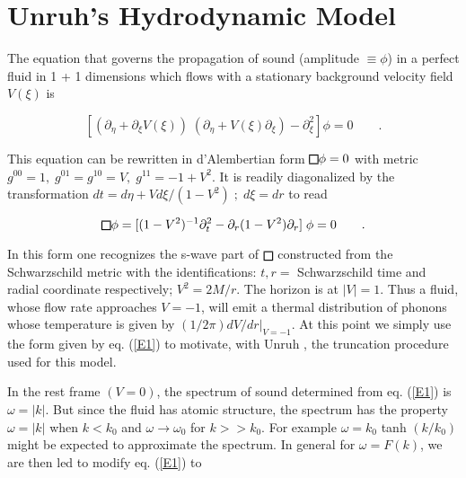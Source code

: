 \documentclass[12pt]{article}
\def\sqr#1#2{{\vcenter{\vbox{\hrule height.#2pt
          \hbox{\vrule width.#2pt height#1pt \kern#1pt
           \vrule width.#2pt}
           \hrule height.#2pt}}}}
\def\square{\mathchoice\sqr68\sqr68\sqr{4.2}6\sqr{3}6}
\begin{document}
\section{Unruh's Hydrodynamic Model}\label{SS2}



The equation that governs the propagation of sound (amplitude $ \equiv \phi $) 
in a perfect fluid in 1 + 1 dimensions which flows with a stationary background
velocity  field $V(\xi)$ is

\begin{equation}
\label{E1}
[ \left( \partial_{\eta} + \partial_\xi V (\xi) \right) \;
(\partial_{\eta} + V (\xi) \partial_{\xi} ) - \partial_{\xi} ^2 ] \phi =
0 \qquad .  
\end{equation}


\noindent
This equation can be rewritten in d'Alembertian form  $ \square \phi =
0 $ with metric $ g^{00} = 1, \; g ^{01} = g^{10} = V, \; g^{11} = - 1 + V^2$.
It is readily diagonalized by the transformation $ dt = d \eta + V d\xi / (1 -
V^2) \; ; \; d \xi = d r$ to read

\begin{equation}
\label{E2}
\square \phi = [ ( 1 - V^2)^{-1} \partial_t ^2 - \partial_r ( 1 - V^2)
\partial_r ] \; \phi = 0 \qquad . 
\end{equation}



In this form one recognizes the s-wave part of $ \square$ constructed from the
Schwarzschild metric with the identifications: $ t, r= $ Schwarzschild time and
radial coordinate respectively; $ V^2 = 2 M / r$. The horizon is at $ \vert V
\vert = 1$. Thus a fluid, whose flow rate approaches $ V = - 1$, will emit a
thermal distribution of phonons whose temperature is given by $ (1/2 \pi) d V /
d r \vert _{V = -1}$. 
At this point we simply use the form given by  eq. (\ref{E1})
to motivate, with Unruh \cite{Un94}, 
the truncation procedure used for this model.



In the rest frame $ (V = 0)$, the spectrum of sound determined from 
 eq. (\ref{E1}) is $ \omega = \vert k \vert $. But since the fluid has atomic
structure, the spectrum has the property $ \omega = \vert k \vert $ when $ k
< k_0$ and $ \omega \to \omega_0$ for $ k >> k_0$. 
 For example $ \omega = k_0$ tanh $(k/k_0)$ might be expected to
approximate the spectrum. In general for $ \omega = F (k)$, we are then led to
modify  eq. (\ref{E1}) to
\end{document}

